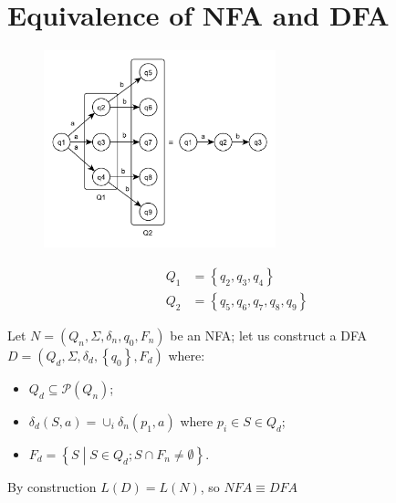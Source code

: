 \section{Equivalence of NFA and DFA}
\begin{figure}[H]
    \centerline{\includegraphics[width=0.6\textwidth]{img/1.pdf}}
\end{figure}
\begin{align*}
    Q_1 &= \left\{q_2, q_3, q_4\right\}\\
    Q_2 &= \left\{q_5, q_6, q_7, q_8, q_9\right\}
\end{align*}

Let $N = (Q_n, \Sigma, \delta_n, q_0, F_n)$ be an NFA; let us construct a DFA $D = (Q_d, \Sigma, \delta_d, \left\{q_0\right\}, F_d)$ where:
\begin{itemize}
    \item $Q_d \subseteq \mathscr{P}(Q_n)$;
    \item $\delta_d(S, a) = \cup_i \delta_n(p_1, a)$ where $p_i \in S \in Q_d$;
    \item $F_d = \left\{S \middle| S \in Q_d; S \cap F_n \neq \emptyset \right\}$.
\end{itemize}
By construction $L(D) = L(N)$, so $NFA \equiv DFA$

